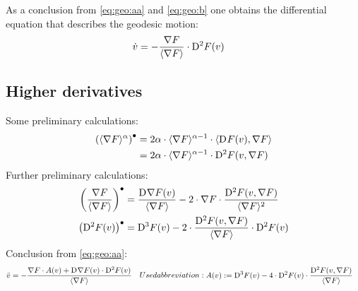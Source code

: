 As a conclusion from \eqref{eq:geo:aa} and \eqref{eq:geo:b}
one obtains the differential equation that describes the geodesic motion:
\begin{align}
\dot{ v }   &=  -\frac{ \nabla F  }{ \langle  \nabla F   \rangle } \cdot \mathrm{D}^{  2  } F ( v )
\end{align}



\subsection{Higher derivatives}



Some preliminary calculations:
\begin{subequations}    
    \begin{align}
        \left( \langle  \nabla F  \rangle^\alpha \right)^\bullet
        &=
        2 \alpha \cdot \langle  \nabla F  \rangle^{\alpha-1} \cdot
        \langle  \mathrm{D}^{  }F( v ) ,  \nabla F  \rangle   \\
        &=
        2 \alpha \cdot \langle  \nabla F  \rangle^{\alpha-1} \cdot
        \mathrm{D}^{ 2 }F( v, \nabla F )
    \end{align}
\end{subequations}
Further preliminary calculations:
\begin{align}
\left( \frac{ \nabla F  }{ \langle  \nabla F   \rangle } \right)^\bullet
&=   \frac{ \mathrm{D}^{  } \nabla F  ( v ) }{ \langle  \nabla F   \rangle }
            -  2 \cdot \nabla F  \cdot \frac{ \mathrm{D}^{  2  } F ( v, \nabla F  ) }{ \langle  \nabla F   \rangle^2 }\\
\left( \mathrm{D}^{  2  } F ( v ) \right)^\bullet  &=
\mathrm{D}^{  3  } F ( v )  -  2 \cdot \frac{ \mathrm{D}^{  2  } F ( v, \nabla F  ) }{ \langle  \nabla F   \rangle } \cdot \mathrm{D}^{ 2 }F( v )
\end{align}
Conclusion from \eqref{eq:geo:aa}:
\begin{subequations}
\begin{align}
\ddot{ v }   &=
- \frac{ \grad F \mult A( v )  +
\diff{}{ \grad{ F } }( v ) \mult \diff{ 2 }{ F }( v ) }{ \skaq{ \grad{ F } } }
\end{align}
Used abbreviation:
\begin{align}
    A( v )  &:=
    \diff{ 3 }{ F }( v ) -
    4 \mult \diff{ 2 }{ F }( v ) \mult
    \frac{ \diff{ 2 }{ F }( v, \grad{ F } ) }{ \skaq{ \grad{ F } } }
\end{align}
\end{subequations}
